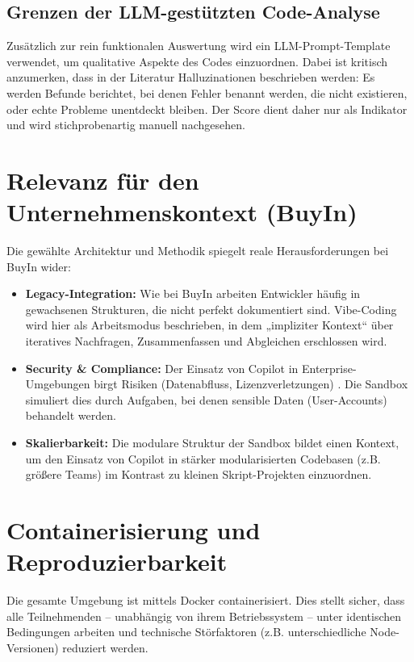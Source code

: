 \subsection{Grenzen der LLM-gestützten Code-Analyse}
Zusätzlich zur rein funktionalen Auswertung wird ein LLM-Prompt-Template verwendet, um qualitative Aspekte des Codes einzuordnen. Dabei ist kritisch anzumerken, dass in der Literatur Halluzinationen beschrieben werden: Es werden Befunde berichtet, bei denen Fehler benannt werden, die nicht existieren, oder echte Probleme unentdeckt bleiben. Der Score dient daher nur als Indikator und wird stichprobenartig manuell nachgesehen.


\section{Relevanz für den Unternehmenskontext (BuyIn)}

Die gewählte Architektur und Methodik spiegelt reale Herausforderungen bei BuyIn wider:
\begin{itemize}
    \item  \textbf{Legacy-Integration:} Wie bei BuyIn arbeiten Entwickler häufig in gewachsenen Strukturen, die nicht perfekt dokumentiert sind. Vibe-Coding wird hier als Arbeitsmodus beschrieben, in dem „impliziter Kontext“ über iteratives Nachfragen, Zusammenfassen und Abgleichen erschlossen wird.
    \item  \textbf{Security \& Compliance:} Der Einsatz von Copilot in Enterprise-Umgebungen birgt Risiken (Datenabfluss, Lizenzverletzungen) \parencite{pearce2022asleep}. Die Sandbox simuliert dies durch Aufgaben, bei denen sensible Daten (User-Accounts) behandelt werden.
    \item  \textbf{Skalierbarkeit:} Die modulare Struktur der Sandbox bildet einen Kontext, um den Einsatz von Copilot in stärker modularisierten Codebasen (z.B. größere Teams) im Kontrast zu kleinen Skript-Projekten einzuordnen.
\end{itemize}

\section{Containerisierung und Reproduzierbarkeit}

Die gesamte Umgebung ist mittels Docker containerisiert. Dies stellt sicher, dass alle Teilnehmenden -- unabhängig von ihrem Betriebssystem -- unter identischen Bedingungen arbeiten und technische Störfaktoren (z.B. unterschiedliche Node-Versionen) reduziert werden.

